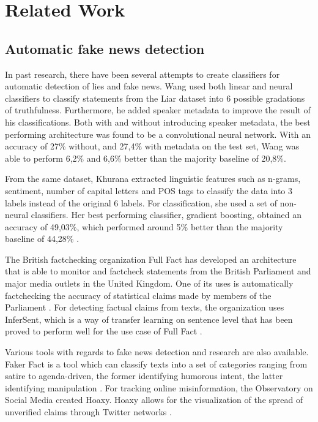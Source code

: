 \section{Related Work}
\subsection{Automatic fake news detection}
In past research, there have been several attempts to create classifiers for automatic detection of lies and fake news. 
Wang used both linear and neural classifiers to classify statements from the Liar dataset into 6 possible gradations of truthfulness. 
Furthermore, he added speaker metadata to improve the result of his classifications.
Both with and without introducing speaker metadata, the best performing architecture was found to be a convolutional neural network. 
With an accuracy of 27\% without, and 27,4\% with metadata on the test set, Wang was able to perform 6,2\% and 6,6\% better than the majority baseline of 20,8\%\cite{wang2018}.

From the same dataset, Khurana extracted linguistic features such as n-grams, sentiment, number of capital letters and POS tags to classify the data into 3 labels instead of the original 6 labels. 
For classification, she used a set of non-neural classifiers. 
Her best performing classifier, gradient boosting, obtained an accuracy of 49,03\%, which performed around 5\% better than the majority baseline of 44,28\% \cite{khurana2017}.

The British factchecking organization Full Fact has developed an architecture that is able to monitor and factcheck statements from the British Parliament and major media outlets in the United Kingdom. 
One of its uses is automatically factchecking the accuracy of statistical claims made by members of the Parliament \cite{babakar2016}.
For detecting factual claims from texts, the organization uses InferSent, which is a way of transfer learning on sentence level that has been proved to perform well for the use case of Full Fact \cite{pydata2018}.

Various tools with regards to fake news detection and research are also available. 
Faker Fact is a tool which can classify texts into a set of categories ranging from satire to agenda-driven, the former identifying humorous intent, the latter identifying manipulation \cite{fakerfact}. 
For tracking online misinformation, the Observatory on Social Media created Hoaxy. 
Hoaxy allows for the visualization of the spread of unverified claims through Twitter networks \cite{shao2016}.

